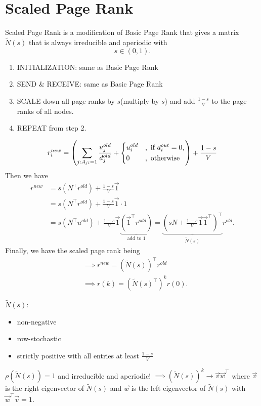 \section{Scaled Page Rank}
Scaled Page Rank is a modification of Basic Page Rank that gives a matrix \(\widetilde{N}(s)\) that is always irreducible and aperiodic with
\[
	s\in \left( 0, 1 \right).
\]
\begin{enumerate}
	\item INITIALIZATION: same as Basic Page Rank
	\item SEND \& RECEIVE: same as Basic Page Rank
	\item SCALE down all page ranks by \(s\)(multiply by \(s\)) and add \(\frac{1-s}{V}\) to the page ranks of all nodes.
	\item REPEAT from step 2.
\end{enumerate}

\[
	r_{i}^{new} = \left(\sum\limits_{j:A_{ji} = 1} \frac{u_{j}^{old}}{d_{j}^{old}}+\begin{dcases}
		u_{i}^{old} & , \text{ if }d_{i}^{out} = 0, \\
		0           & , \text{ otherwise}
	\end{dcases}\right)+\frac{1-s}{V}
\]
Then we have
\[
	\begin{split}
		r^{new} &= s(N^{\top}r^{old})+\frac{1-s}{V}\vec{1}\\
		&= s(N^{\top}r^{old})+\frac{1-s}{V}\vec{1}\cdot 1\\
		&= s(N^{\top}u^{old}) + \frac{1-s}{V}\vec{1} \underbrace{(\vec{1}^{\top}r^{odd})}_{\text{add to }1}
		= \underbrace{(sN + \frac{1-s}{V}\vec{1}\vec{1}^{\top})^{\top}}_{\widetilde{N}(s)} r^{old}.
	\end{split}
\]
Finally, we have the scaled page rank being
\[
	\begin{split}
		&\implies r^{new} = (\widetilde{N}(s))^{\top}r^{old}\\
		&\implies r(k) = (\widetilde{N}(s)^{\top})^k r(0).
	\end{split}
\]

\begin{note}
	\(\widetilde{N}(s)\):
	\begin{itemize}
		\item non-negative
		\item row-stochastic
		\item strictly positive with all entries at least \(\frac{1-s}{V}\)
	\end{itemize}
\end{note}
\(\rho(\widetilde{N}(s)) = 1\) and irreducible and aperiodic! \(\implies (\widetilde{N}(s))^k \to \vec{v}\vec{w}^{\top}\) where
\(\vec{v}\) is the right eigenvector of \(\widetilde{N}(s)\) and \(\vec{w}\) is the left eigenvector of \(\widetilde{N}(s)\) with
\(\vec{w}^{\top} \vec{v} = 1\).

